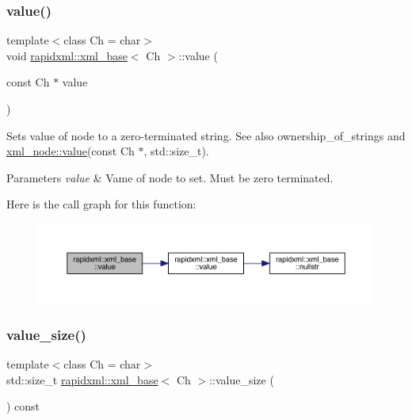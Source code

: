 \subsubsection{\texorpdfstring{value()}{value()}\hspace{0.1cm}{\footnotesize\ttfamily [3/3]}}
{\footnotesize\ttfamily template$<$class Ch  = char$>$ \\
void \mbox{\hyperlink{classrapidxml_1_1xml__base}{rapidxml\+::xml\+\_\+base}}$<$ Ch $>$\+::value (\begin{DoxyParamCaption}\item[{const Ch $\ast$}]{value }\end{DoxyParamCaption})\hspace{0.3cm}{\ttfamily [inline]}}

Sets value of node to a zero-\/terminated string. See also ownership\+\_\+of\+\_\+strings and \mbox{\hyperlink{classrapidxml_1_1xml__base_a6af65de5e59ac497cd69838f8a89d602}{xml\+\_\+node\+::value}}(const Ch $\ast$, std\+::size\+\_\+t).
\begin{DoxyParams}{Parameters}
{\em value} & Vame of node to set. Must be zero terminated. \\
\hline
\end{DoxyParams}
Here is the call graph for this function\+:\nopagebreak
\begin{figure}[H]
\begin{center}
\leavevmode
\includegraphics[width=350pt]{classrapidxml_1_1xml__base_a81e63ec4bfd2d7ef0a6c2ed49be6e623_cgraph}
\end{center}
\end{figure}
\mbox{\label{classrapidxml_1_1xml__base_a2eb123d471b1567fa4832b6ee2b75493}} 
\subsubsection{\texorpdfstring{value\_size()}{value\_size()}}
{\footnotesize\ttfamily template$<$class Ch  = char$>$ \\
std\+::size\+\_\+t \mbox{\hyperlink{classrapidxml_1_1xml__base}{rapidxml\+::xml\+\_\+base}}$<$ Ch $>$\+::value\+\_\+size (\begin{DoxyParamCaption}{ }\end{DoxyParamCaption}) const\hspace{0.3cm}{\ttfamily [inline]}}

